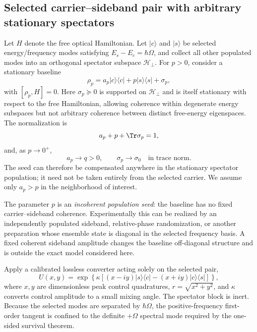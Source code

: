 \subsection{Selected carrier--sideband pair with arbitrary stationary spectators}

Let $H$ denote the free optical Hamiltonian. Let $|c\rangle$ and $|s\rangle$ be selected energy/frequency modes satisfying $E_s-E_c=\hbar\Omega$, and collect all other populated modes into an orthogonal spectator subspace $\mathcal H_\perp$. For $p>0$, consider a stationary baseline
\begin{equation}
\rho_p=a_p|c\rangle\langle c|+p|s\rangle\langle s|+\sigma_p,
\label{eq:rho_p_general}
\end{equation}
with $[\rho_p,H]=0$. Here $\sigma_p\succeq0$ is supported on $\mathcal H_\perp$ and is itself stationary with respect to the free Hamiltonian, allowing coherence within degenerate energy subspaces but not arbitrary coherence between distinct free-energy eigenspaces. The normalization is
\begin{equation}
a_p+p+\Tr\sigma_p=1,
\end{equation}
and, as $p\to0^+$,
\begin{equation}
a_p\to q>0,
\qquad
\sigma_p\to\sigma_0
\quad\text{in trace norm}.
\label{eq:seed_path_limit}
\end{equation}
The seed can therefore be compensated anywhere in the stationary spectator population; it need not be taken entirely from the selected carrier. We assume only $a_p>p$ in the neighborhood of interest.

The parameter $p$ is an \emph{incoherent population seed}: the baseline has no fixed carrier--sideband coherence. Experimentally this can be realized by an independently populated sideband, relative-phase randomization, or another preparation whose ensemble state is diagonal in the selected frequency basis. A fixed coherent sideband amplitude changes the baseline off-diagonal structure and is outside the exact model considered here.

Apply a calibrated lossless converter acting solely on the selected pair,
\begin{equation}
U(x,y)=\exp\!\left\{\kappa[(x-iy)|s\rangle\langle c|-(x+iy)|c\rangle\langle s|]\right\},
\label{eq:converter_general}
\end{equation}
where $x,y$ are dimensionless peak control quadratures, $r=\sqrt{x^2+y^2}$, and $\kappa$ converts control amplitude to a small mixing angle. The spectator block is inert. Because the selected modes are separated by $\hbar\Omega$, the positive-frequency first-order tangent is confined to the definite $+\Omega$ spectral mode required by the one-sided survival theorem.

